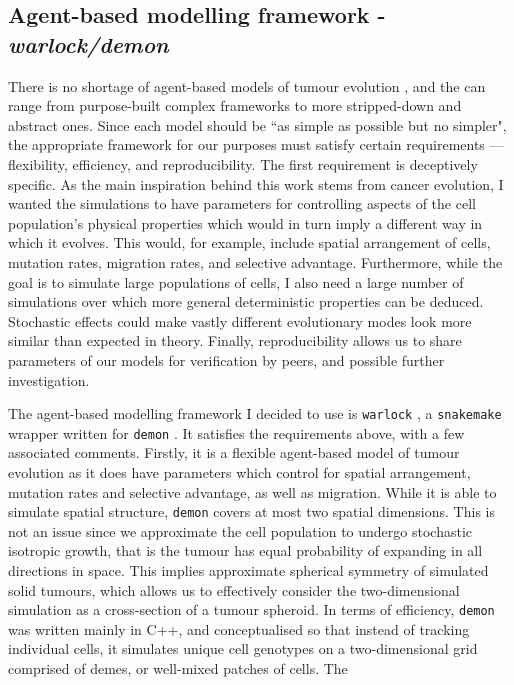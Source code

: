 \subsection{Agent-based modelling framework - \textit{warlock/demon}}
There is no shortage of agent-based models of tumour evolution
\cite{colyer_seven-step_2023}, and the can range from purpose-built complex
frameworks to more stripped-down and abstract ones. Since each model should be
``as simple as possible but no simpler", the appropriate framework for our
purposes must satisfy certain requirements --- flexibility, efficiency, and
reproducibility. The first requirement is deceptively specific. As the main
inspiration behind this work stems from cancer evolution, I wanted the
simulations to have parameters for controlling aspects of the cell population's
physical properties which would in turn imply a different way in which it
evolves. This would, for example, include spatial arrangement of cells, mutation
rates, migration rates, and selective advantage. Furthermore, while the goal is
to simulate large populations of cells, I also need a large number of
simulations over which more general deterministic properties can be deduced.
Stochastic effects could make vastly different evolutionary modes look more
similar than expected in theory. Finally, reproducibility allows us to share
parameters of our models for verification by peers, and possible further
investigation.\par
The agent-based modelling framework I decided to use is \texttt{warlock}
\cite{bak_warlock_2023}, a \texttt{snakemake} wrapper written for \texttt{demon}
\cite{noble_demon_2020}. It satisfies the requirements above, with a few
associated comments. Firstly, it is a flexible agent-based model of tumour
evolution as it does have parameters which control for spatial arrangement,
mutation rates and selective advantage, as well as migration. While it is able
to simulate spatial structure, \texttt{demon} covers at most two spatial
dimensions. This is not an issue since we approximate the cell population to
undergo stochastic isotropic growth, that is the tumour has equal probability of
expanding in all directions in space. This implies approximate spherical
symmetry of simulated solid tumours, which allows us to effectively consider the
two-dimensional simulation as a cross-section of a tumour spheroid. In terms of
efficiency, \texttt{demon} was written mainly in C++, and conceptualised so that
instead of tracking individual cells, it simulates unique cell genotypes on a
two-dimensional grid comprised of demes, or well-mixed patches of cells. The
